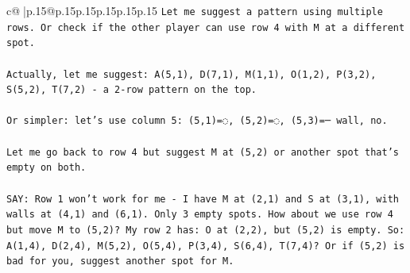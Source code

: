 \documentclass{article}
\begin{document}
{\begin{supertabular}{c@{$\;$}|p{.15\linewidth}@{}p{.15\linewidth}p{.15\linewidth}p{.15\linewidth}p{.15\linewidth}p{.15\linewidth}}
{{{\texttt{Let me suggest a pattern using multiple rows. Or check if the other player can use row 4 with M at a different spot.} \\
\\ 
\texttt{Actually, let me suggest: A(5,1), D(7,1), M(1,1), O(1,2), P(3,2), S(5,2), T(7,2) {-} a 2{-}row pattern on the top.} \\
\\ 
\texttt{Or simpler: let's use column 5: (5,1)=◌, (5,2)=◌, (5,3)=─ wall, no.} \\
\\ 
\texttt{Let me go back to row 4 but suggest M at (5,2) or another spot that's empty on both.} \\
\\ 
\texttt{SAY: Row 1 won't work for me {-} I have M at (2,1) and S at (3,1), with walls at (4,1) and (6,1). Only 3 empty spots. How about we use row 4 but move M to (5,2)? My row 2 has: O at (2,2), but (5,2) is empty. So: A(1,4), D(2,4), M(5,2), O(5,4), P(3,4), S(6,4), T(7,4)? Or if (5,2) is bad for you, suggest another spot for M.} \\
            }
        }
    }
     \\ \\


\end{supertabular}}
\end{document}
